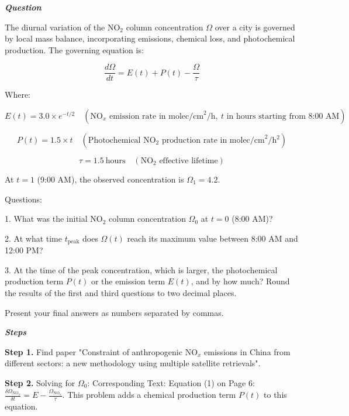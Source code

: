 \begin{tcolorbox}[
    breakable,
    title=Example of Scientific Deep Research in Earth,
    colback=LighterGray,
    colframe=DeepPurple,
    colbacktitle=DeepPurple,
    coltitle=White,
]
\textbf{\emph{\textcolor{DeepPurple}{Question}}}

The diurnal variation of the NO\(_2\) column concentration \( \Omega \) over a city is governed by local mass balance, incorporating emissions, chemical loss, and photochemical production. The governing equation is:

\[
\frac{d\Omega}{dt} = E(t) + P(t) - \frac{\Omega}{\tau}
\]

Where:

\[
E(t) = 3.0 \times e^{-t/2} \quad (\text{NO}_x \text{ emission rate in molec/cm}^2/\text{h},\ t \text{ in hours starting from 8:00 AM})
\]

\[
P(t) = 1.5 \times t \quad (\text{Photochemical NO}_2 \text{ production rate in molec/cm}^2/\text{h}^2)
\]

\[
\tau = 1.5\ \text{hours} \quad (\text{NO}_2 \text{ effective lifetime})
\]

At \( t=1 \) (9:00 AM), the observed concentration is \( \Omega_1 = 4.2 \).

Questions:

1. What was the initial NO\(_2\) column concentration \( \Omega_0 \) at \( t=0 \) (8:00 AM)?

2. At what time \( t_{\text{peak}} \) does \( \Omega(t) \) reach its maximum value between 8:00 AM and 12:00 PM?

3. At the time of the peak concentration, which is larger, the photochemical production term \( P(t) \) or the emission term \( E(t) \), and by how much? Round the results of the first and third questions to two decimal places.

Present your final answers as numbers separated by commas.

\textbf{\emph{\textcolor{DeepPurple}{Steps}}}

\textbf{\textcolor{CaseOrange}{Step 1.}} Find paper "Constraint of anthropogenic NO$_x$ emissions in China from different sectors: a new methodology using multiple satellite retrievals".

\textbf{\textcolor{CaseOrange}{Step 2.}} Solving for $\Omega_0$: Corresponding Text: Equation (1) on Page 6: $\frac{\delta \Omega_{\mathrm{NO}_x}}{\delta t} = E - \frac{\Omega_{\mathrm{NO}_x}}{\tau}$. This problem adds a chemical production term $P(t)$ to this equation.


\end{tcolorbox}
